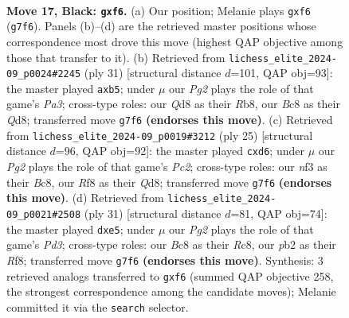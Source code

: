 \documentclass[11pt]{article}
\begin{document}
\clearpage

\begin{figure}[p]\centering
\begin{subfigure}{0.46\textwidth}\centering
\resizebox{\linewidth}{!}{%
\newchessgame
\chessboard[
  setfen={r1bq1rk1/1p1n2pp/n1p1pP2/p2p4/3P1P2/2N2N2/PPP2KPP/2RQ1B1R b - - 0 17},
  showmover=false,
  pgfstyle=straightmove, color=movearrow, markmove={g7-f6}
]}
\caption{}
\end{subfigure}\hfill
\begin{subfigure}{0.46\textwidth}\centering
\resizebox{\linewidth}{!}{%
\newchessgame
\chessboard[
  setfen={1r1q1rk1/2n1p1bp/p2p1np1/1PpP4/7P/2N3PN/1PP2P2/R1BQR1K1 b - - 0 16},
  showmover=false,
  pgfstyle=straightmove, color=movearrow, markmove={a6-b5}
]}
\caption{}
\end{subfigure}
\\[4pt]
\begin{subfigure}{0.46\textwidth}\centering
\resizebox{\linewidth}{!}{%
\newchessgame
\chessboard[
  setfen={r1bqr1k1/1pp2pp1/p2P1n1p/4p3/4P3/2PP1N1P/P2Q1PP1/R1B1R1K1 b - - 0 13},
  showmover=false,
  pgfstyle=straightmove, color=movearrow, markmove={c7-d6}
]}
\caption{}
\end{subfigure}\hfill
\begin{subfigure}{0.46\textwidth}\centering
\resizebox{\linewidth}{!}{%
\newchessgame
\chessboard[
  setfen={2rq1rk1/1p1b1pp1/p1np3p/3NP2n/4P3/5N1P/PP3PP1/R2QRBK1 b - - 0 16},
  showmover=false,
  pgfstyle=straightmove, color=movearrow, markmove={d6-e5}
]}
\caption{}
\end{subfigure}
\caption{\textbf{Move 17, Black: \texttt{gxf6}.} (a) Our position; Melanie plays \texttt{gxf6} (\texttt{g7f6}). Panels (b)--(d) are the retrieved master positions whose correspondence most drove this move (highest QAP objective among those that transfer to it). (b) Retrieved from \texttt{lichess\_elite\_2024-09\_p0024\#2245} (ply 31) [structural distance $d$=101, QAP obj=93]: the master played \texttt{axb5}; under $\mu$ our \emph{Pg2} plays the role of that game's \emph{Pa3}; cross-type roles: our \emph{Q}d8 as their \emph{R}b8, our \emph{B}c8 as their \emph{Q}d8; transferred move \texttt{g7f6} \textbf{(endorses this move)}. (c) Retrieved from \texttt{lichess\_elite\_2024-09\_p0019\#3212} (ply 25) [structural distance $d$=96, QAP obj=92]: the master played \texttt{cxd6}; under $\mu$ our \emph{Pg2} plays the role of that game's \emph{Pc2}; cross-type roles: our \emph{n}f3 as their \emph{B}c8, our \emph{R}f8 as their \emph{Q}d8; transferred move \texttt{g7f6} \textbf{(endorses this move)}. (d) Retrieved from \texttt{lichess\_elite\_2024-09\_p0021\#2508} (ply 31) [structural distance $d$=81, QAP obj=74]: the master played \texttt{dxe5}; under $\mu$ our \emph{Pg2} plays the role of that game's \emph{Pd3}; cross-type roles: our \emph{B}c8 as their \emph{R}c8, our \emph{p}b2 as their \emph{R}f8; transferred move \texttt{g7f6} \textbf{(endorses this move)}. Synthesis: 3 retrieved analogs transferred to \texttt{gxf6} (summed QAP objective 258, the strongest correspondence among the candidate moves); Melanie committed it via the \texttt{search} selector.}
\label{fig:thought-m33}
\end{figure}
\end{document}
